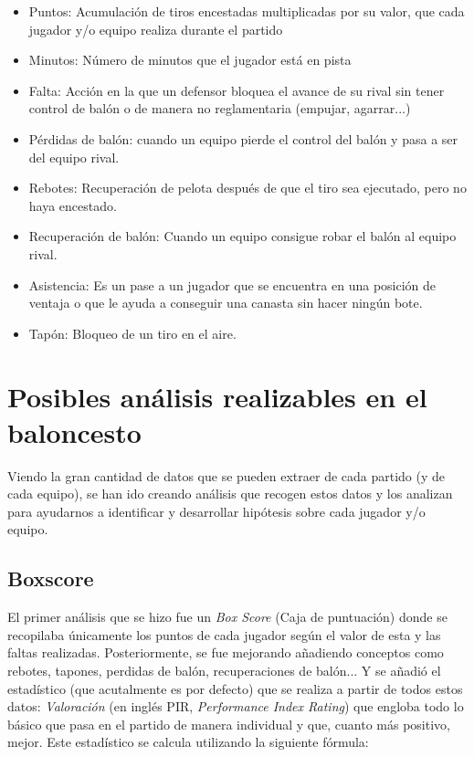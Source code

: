 \documentclass[paper=a4, fontsize=9pt]{article}
\begin{document}
\begin{itemize}

\item Puntos: Acumulación de tiros encestadas multiplicadas por su valor, que cada  jugador y/o equipo realiza durante el partido
\item Minutos: Número de minutos que el jugador está en pista
\item Falta: Acción en la que un defensor bloquea el avance de su rival sin tener control de balón o de manera no reglamentaria (empujar, agarrar...)
\item Pérdidas de balón: cuando un equipo pierde el control del balón y pasa a ser del equipo rival.
\item Rebotes: Recuperación de pelota después de que el tiro sea ejecutado, pero no haya encestado.
\item Recuperación de balón: Cuando un equipo consigue robar el balón al equipo rival.
\item Asistencia: Es un pase a un jugador que se encuentra en una posición de ventaja o que le ayuda a conseguir una canasta sin hacer ningún bote.
\item Tapón: Bloqueo de un tiro en el aire.

\end{itemize}

\section{Posibles análisis realizables en el baloncesto}

Viendo la gran cantidad de datos que se pueden extraer de cada partido (y de cada equipo), se han ido creando análisis que recogen estos datos y los analizan para ayudarnos a identificar y desarrollar hipótesis sobre cada jugador y/o equipo.

\subsection{Boxscore}

El primer análisis que se hizo fue un \emph{Box Score} (Caja de puntuación) donde se recopilaba únicamente los puntos de cada jugador según el valor de esta y las faltas realizadas. Posteriormente, se fue mejorando añadiendo conceptos como rebotes, tapones, perdidas de balón, recuperaciones de balón... Y se añadió el estadístico (que acutalmente es por defecto) que se realiza a partir de todos estos datos: \emph{Valoración} (en inglés PIR, \emph{Performance Index Rating}) que engloba todo lo básico que pasa en el partido de manera individual y que, cuanto más positivo, mejor. Este estadístico se calcula utilizando la siguiente fórmula:
  
\end{document}
